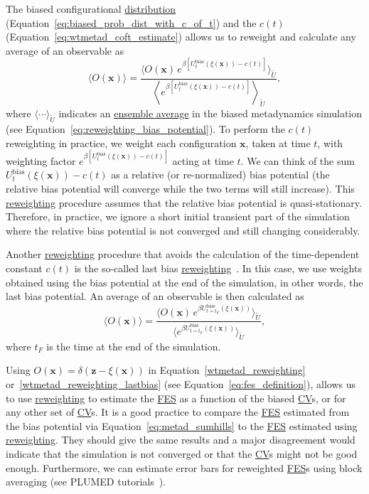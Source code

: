 \documentclass[9pt,review]{livecoms}
\newcommand{\vx}{\mathbf{x}}
\newcommand{\vz}{\mathbf{z}}
\begin{document}
The biased configurational \hyperlink{ref:Distribution} {distribution}  (Equation~\ref{eq:biased_prob_dist_with_c_of_t}) and the $c(t)$ (Equation~\ref{eq:wtmetad_coft_estimate}) allows us to reweight and calculate any average of an observable as
\begin{equation}
\label{wtmetad_reweighting}
\langle O(\vx) \rangle = \frac{\langle O(\vx)
\,
e^{
\beta\left[
U_{t}^{\mathrm{bias}}(\xi(\vx))-c(t)
\right]}\rangle_{\tilde U}}
{\left\langle
e^{\beta \left[
U_{t}^{\mathrm{bias}}(\xi(\vx))-c(t)
\right]} \right\rangle_{\tilde U}},
\end{equation}
where $\langle \cdots \rangle_{\tilde U}$ indicates an \hyperlink{ref:ensemble_average} {ensemble average} in the biased metadynamics simulation (see Equation~\ref{eq:reweighting_bias_potential}). To perform the $c(t)$ reweighting in practice, we weight each configuration $\vx$, taken at time $t$, with weighting factor $e^{\beta\left[U_{t}^{\mathrm{bias}}(\xi(\vx))-c(t)\right]}$ acting at time $t$. We can think of the sum $U_{t}^{\mathrm{bias}}(\xi(\vx))-c(t)$ as a relative (or re-normalized) bias potential (the relative bias potential will converge while the two terms will still increase). This \hyperlink{ref:Reweighting} {reweighting} procedure assumes that the relative bias potential is quasi-stationary. Therefore, in practice, we ignore a short initial transient part of the simulation where the relative bias potential is not converged and still changing considerably.


Another \hyperlink{ref:Reweighting} {reweighting} procedure that avoids the calculation of the time-dependent constant $c(t)$ is the so-called last bias \hyperlink{ref:Reweighting} {reweighting}~\cite{Branduardi-JCTC-2012}. In this case, we use weights obtained using the bias potential at the end of the simulation, in other words, the last bias potential. An average of an observable is then calculated as
\begin{equation}
\label{wtmetad_reweighting_lastbias}
\langle O(\vx) \rangle = \frac{\langle O(\vx)
\,
e^{
\beta
U_{t=t_F}^{\mathrm{bias}}(\xi(\vx))
}\rangle_{\tilde U}}
{\langle
e^{\beta
U_{t=t_F}^{\mathrm{bias}}(\xi(\vx))
} \rangle_{\tilde U}},
\end{equation}
where $t_F$ is the time at the end of the simulation.

Using $O(\vx) = \delta(\vz-\xi(\vx))$ in Equation~\ref{wtmetad_reweighting} or~\ref{wtmetad_reweighting_lastbias} (see Equation~\ref{eq:fes_definition}), allows us to use \hyperlink{ref:Reweighting} {reweighting} to estimate the \hyperlink{ref:FES} {FES} as a function of the biased \hyperlink{ref:CV} {CV}s, or for any other set of \hyperlink{ref:CV} {CV}s. It is a good practice to compare the \hyperlink{ref:FES} {FES} estimated from the bias potential via Equation~\ref{eq:metad_sumhills} to the \hyperlink{ref:FES} {FES} estimated using \hyperlink{ref:Reweighting} {reweighting}. They should give the same results and a major disagreement would indicate that the simulation is not converged or that the \hyperlink{ref:CV} {CV}s might not be good enough. Furthermore, we can estimate error bars for reweighted \hyperlink{ref:FES} {FES}s using block averaging (see PLUMED tutorials~\cite{plumed_masterclass}).
\end{document}
